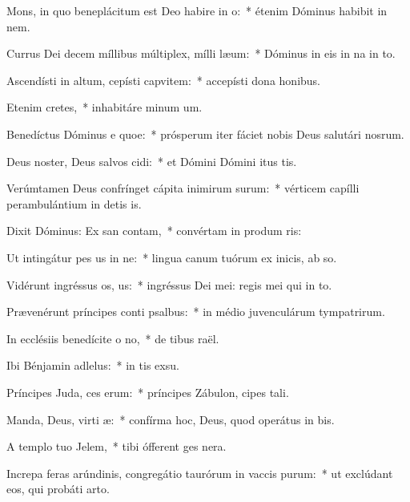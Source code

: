 \item Mons, in quo beneplácitum est Deo habire in o:~* étenim Dóminus habibit in nem.
\item Currus Dei decem míllibus múltiplex, mílli læum:~* Dóminus in eis in na in to.
\item Ascendísti in altum, cepísti capvitem:~* accepísti dona  honibus.
\item Etenim  cretes,~* inhabitáre minum um.
\item Benedíctus Dóminus e quoe:~* prósperum iter fáciet nobis Deus salutári nosrum.
\item Deus noster, Deus salvos cidi:~* et Dómini Dómini itus tis.
\item Verúmtamen Deus confrínget cápita inimirum surum:~* vérticem capílli perambulántium in detis is.
\item Dixit Dóminus: Ex san contam,~* convértam in produm ris:
\item Ut intingátur pes us in ne:~* lingua canum tuórum ex inicis, ab so.
\item Vidérunt ingréssus os, us:~* ingréssus Dei mei: regis mei qui  in to.
\item Prævenérunt príncipes conti psalbus:~* in médio juvenculárum tympatrirum.
\item In ecclésiis benedícite o no,~* de tibus raël.
\item Ibi Bénjamin adlelus:~* in tis exsu.
\item Príncipes Juda, ces erum:~* príncipes Zábulon, cipes tali.
\item Manda, Deus, virti æ:~* confírma hoc, Deus, quod operátus  in bis.
\item A templo tuo  Jelem,~* tibi ófferent ges nera.
\item Increpa feras arúndinis, congregátio taurórum in vaccis purum:~* ut exclúdant eos, qui probáti  arto.
